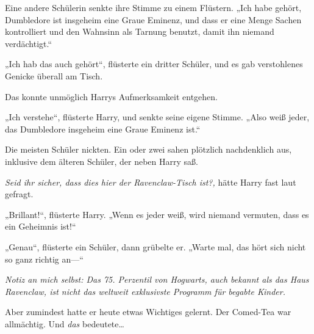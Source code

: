 Eine andere Schülerin senkte ihre Stimme zu einem Flüstern. „Ich habe gehört, Dumbledore ist insgeheim eine Graue Eminenz, und dass er eine Menge Sachen kontrolliert und den Wahnsinn als Tarnung benutzt, damit ihn niemand verdächtigt.“

„Ich hab das auch gehört“, flüsterte ein dritter Schüler, und es gab verstohlenes Genicke überall am Tisch.

Das konnte unmöglich Harrys Aufmerksamkeit entgehen.

„Ich verstehe“, flüsterte Harry, und senkte seine eigene Stimme. „Also weiß jeder, das Dumbledore insgeheim eine Graue Eminenz ist.“

Die meisten Schüler nickten. Ein oder zwei sahen plötzlich nachdenklich aus, inklusive dem älteren Schüler, der neben Harry saß.

\emph{Seid ihr sicher, dass dies hier der Ravenclaw-Tisch ist?,} hätte Harry fast laut gefragt.

„Brillant!“, flüsterte Harry. „Wenn es jeder weiß, wird niemand vermuten, dass es ein Geheimnis ist!“

„Genau“, flüsterte ein Schüler, dann grübelte er. „Warte mal, das hört sich nicht so ganz richtig an—“

\emph{Notiz an mich selbst: Das 75. Perzentil von Hogwarts, auch bekannt als das Haus Ravenclaw, ist nicht das weltweit exklusivste Programm für begabte Kinder.}

Aber zumindest hatte er heute etwas Wichtiges gelernt. Der Comed-Tea war allmächtig. Und \emph{das} bedeutete…

